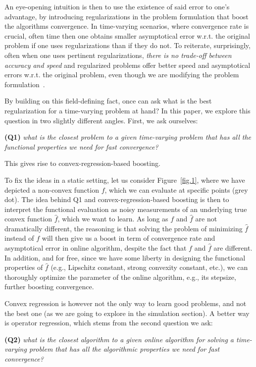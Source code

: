 \documentclass{article}
\begin{document}
An eye-opening intuition is then to use the existence of said error to one's advantage, by introducing regularizations in the problem formulation that boost the algorithms convergence. In time-varying scenarios, where convergence rate is crucial, often time then one obtains smaller asymptotical error w.r.t. the original problem if one uses regularizations than if they do not. To reiterate, surprisingly, often when one uses pertinent regularizations, \emph{there is no trade-off between accuracy and speed} and regularized problems offer better speed and asymptotical errors w.r.t. the original problem, even though we are modifying the problem formulation~\cite{Simonetto2014d, Bastianello2020asi}.  

By building on this field-defining fact, once can ask what is the best regularization for a time-varying problem at hand? In this paper, we explore this question in two slightly different angles. First, we ask ourselves: 

{\bf (Q1) } \emph{what is the closest problem to a given time-varying problem that has all the functional properties we need for fast convergence?}

This gives rise to convex-regression-based boosting. 
 
To fix the ideas in a static setting, let us consider Figure~\ref{fig.1}, where we have depicted a non-convex function $f$, which we can evaluate at specific points (grey dot). The idea behind Q1 and convex-regression-based boosting is then to interpret the functional evaluation as noisy measurements of an underlying true convex function $\hat{f}$, which we want to learn. As long as $f$ and $\hat{f}$ are not dramatically different, the reasoning is that solving the problem of minimizing $\hat{f}$ instead of $f$ will then give us a boost in term of convergence rate and asymptotical error in online algorithm, despite the fact that $f$ and $\hat{f}$ are different. In addition, and for free, since we have some liberty in designing the functional properties of $\hat{f}$ (e.g., Lipschitz constant, strong convexity constant, etc.), we can thoroughly optimize the parameter of the online algorithm, e.g., its stepsize, further boosting convergence.  

Convex regression is however not the only way to learn good problems, and not the best one (as we are going to explore in the simulation section). A better way is operator regression, which stems from the second question we ask: 

{\bf (Q2) } \emph{what is the closest algorithm to a given online algorithm for solving a time-varying problem that has all the algorithmic properties we need for fast convergence?  
}
\end{document}
